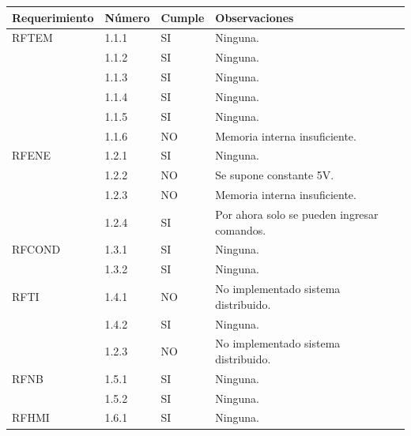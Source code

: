 \begin{table}[h!]
\begin{flushleft}
\begin{tabular}{|m{2.6cm}|m{1.5cm}|m{1.5cm}|m{6.8cm}|}\hline
{\textbf{Requerimiento}} & {\textbf{Número}} & {\textbf{Cumple}} & {\textbf{Observaciones}}\\ \hline
\multicolumn{1}{|l|}{RFTEM} & { 1.1.1 } & { SI } & { Ninguna. }\\ \cline{ 2- 4}
\multicolumn{1}{|l|}{} & { 1.1.2 } & { SI } & { Ninguna. } \\ \cline{ 2- 4}
\multicolumn{1}{|l|}{} & { 1.1.3 } & { SI } & { Ninguna. } \\ \cline{ 2- 4}
\multicolumn{1}{|l|}{} & { 1.1.4 } & { SI } & { Ninguna. } \\ \cline{ 2- 4}
\multicolumn{1}{|l|}{} & { 1.1.5 } & { SI } & { Ninguna. } \\ \cline{ 2- 4}
\multicolumn{1}{|l|}{} & { 1.1.6 } & { NO } & { Memoria interna insuficiente. } \\ \hline
\multicolumn{1}{|l|}{RFENE} & { 1.2.1 } & { SI } & { Ninguna. }\\ \cline{ 2- 4} 
\multicolumn{1}{|l|}{} & { 1.2.2 } & { NO } & { Se supone constante 5V. } \\ \cline{ 2- 4}
\multicolumn{1}{|l|}{} & { 1.2.3 } & { NO } & { Memoria interna insuficiente. } \\ \cline{ 2- 4}
\multicolumn{1}{|l|}{} & { 1.2.4 } & { SI } & { Por ahora solo se pueden ingresar comandos. } \\ \hline
\multicolumn{1}{|l|}{RFCOND} & { 1.3.1 } & { SI } & { Ninguna. }\\ \cline{ 2- 4} 
\multicolumn{1}{|l|}{} & { 1.3.2 } & { SI } & { Ninguna. }\\ \hline
\multicolumn{1}{|l|}{RFTI} & { 1.4.1 } & { NO } & { No implementado sistema distribuido. }\\ \cline{ 2- 4} 
\multicolumn{1}{|l|}{} & { 1.4.2 } & { SI } & { Ninguna. }\\ \cline{ 2- 4} 
\multicolumn{1}{|l|}{} & { 1.2.3 } & { NO } & { No implementado sistema distribuido. }\\ \hline
\multicolumn{1}{|l|}{RFNB} & { 1.5.1 } & { SI } & { Ninguna. }\\ \cline{ 2- 4} 
\multicolumn{1}{|l|}{} & { 1.5.2 } & { SI } & { Ninguna. }\\ \hline
\multicolumn{1}{|l|}{RFHMI} & { 1.6.1 } & { SI } & { Ninguna. }\\ \cline{ 2- 4} 

\end{tabular}
\end{flushleft}
\end{table}
